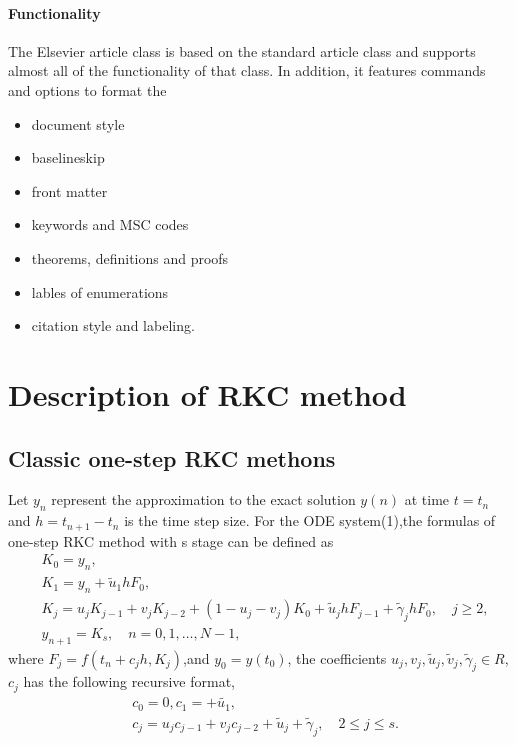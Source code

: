 \documentclass[review]{elsarticle}
\begin{document}
\paragraph{Functionality} The Elsevier article class is based on the standard article class and supports almost all of the functionality of that class. In addition, it features commands and options to format the
\begin{itemize}
\item document style
\item baselineskip
\item front matter
\item keywords and MSC codes
\item theorems, definitions and proofs
\item lables of enumerations
\item citation style and labeling.
\end{itemize}

\section{Description of RKC method }
\subsection{Classic one-step RKC methons}
Let $y_n$ represent the approximation to the exact solution $y(n)$ at time $t=t_n$ and $h=t_{n+1}-t_n$ 
is the time step size. For the ODE system(1),the formulas of one-step RKC method with s stage can be defined as 
\begin{align}
    & K_{0}=y_{n},\nonumber \\
    &K_{1}=y_{n}+\tilde{u}_{1}hF_{0}, \nonumber\\
    &K_{j}=u_{j}K_{j-1}+v_{j}K_{j-2}+(1-u_{j}-v_{j})K_{0}+\tilde{u}_{j}hF_{j-1}+\tilde{\gamma}_{j}hF_{0},\quad j\geq2, \nonumber\\
    &y_{n+1}=K_{s},\quad n=0,1,\ldots,N-1, \nonumber
\end{align}
where \(F_j = f(t_n + c_jh, K_j)\),and $y_0=y(t_0)$, the coefficients \(u_j, v_j, \tilde{u}_j, \tilde{v}_j, \tilde{\gamma}_j \in R \),
 $c_j$ has the following recursive format,
\begin{align}
    &c_0=0,c_1=+\tilde{u_1},\nonumber\\
    &c_j = u_j c_{j-1} + v_j c_{j-2} + \tilde{u}_j + \tilde{\gamma}_j, \quad 2 \leq j \leq s. \nonumber
\end{align}
\end{document}
